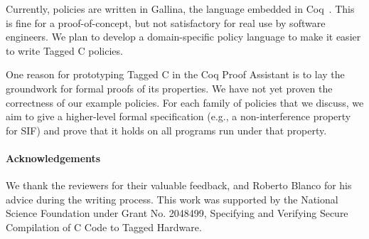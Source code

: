 \documentclass{llncs}
\begin{document}
Currently, policies are written in Gallina, the language embedded in Coq~\cite{coq}. This is fine for a
proof-of-concept, but not satisfactory for real use by software engineers.
We plan to develop a domain-specific policy language to make it easier to write Tagged C policies.

One reason for prototyping Tagged C in the Coq Proof Assistant is to lay the groundwork
for formal proofs of its properties. We have not yet proven the correctness of our example
policies. For each family of policies that we discuss, we aim to give a higher-level formal
specification (e.g., a non-interference property for SIF) and prove that it holds on all
programs run under that property.

\paragraph{Acknowledgements}

We thank the reviewers for their valuable feedback, and Roberto Blanco for his advice during
the writing process. This work was supported by the National Science Foundation under
Grant No. 2048499, Specifying and Verifying Secure Compilation of C Code to Tagged Hardware.

\vfill
\eject


  
\end{document}
